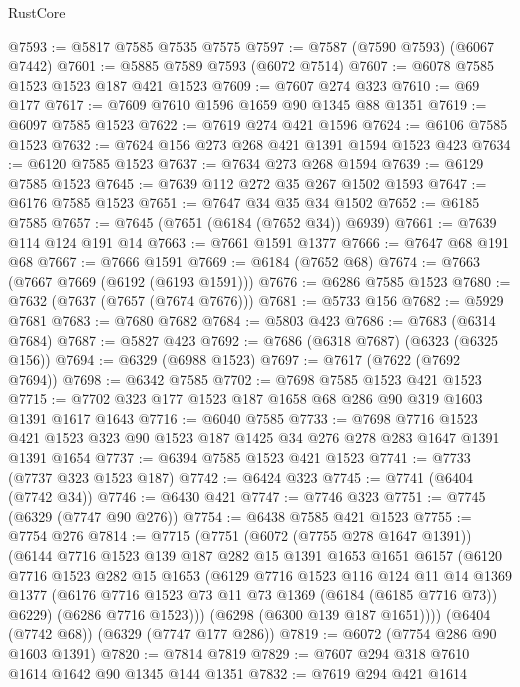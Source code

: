 \begin{lexlean}{RustCore}
\begin{coremodule}
@7593 := @5817 @7585 @7535 @7575
@7597 := @7587 (@7590 @7593) (@6067 @7442)
@7601 := @5885 @7589 @7593 (@6072 @7514)
@7607 := @6078 @7585 @1523 @1523 @187 @421 @1523
@7609 := @7607 @274 @323
@7610 := @69 @177
@7617 := @7609 @7610 @1596 @1659 @90 @1345 @88 @1351
@7619 := @6097 @7585 @1523
@7622 := @7619 @274 @421 @1596
@7624 := @6106 @7585 @1523
@7632 := @7624 @156 @273 @268 @421 @1391 @1594 @1523 @423
@7634 := @6120 @7585 @1523
@7637 := @7634 @273 @268 @1594
@7639 := @6129 @7585 @1523
@7645 := @7639 @112 @272 @35 @267 @1502 @1593
@7647 := @6176 @7585 @1523
@7651 := @7647 @34 @35 @34 @1502
@7652 := @6185 @7585
@7657 := @7645 (@7651 (@6184 (@7652 @34)) @6939)
@7661 := @7639 @114 @124 @191 @14
@7663 := @7661 @1591 @1377
@7666 := @7647 @68 @191 @68
@7667 := @7666 @1591
@7669 := @6184 (@7652 @68)
@7674 := @7663 (@7667 @7669 (@6192 (@6193 @1591)))
@7676 := @6286 @7585 @1523
@7680 := @7632 (@7637 (@7657 (@7674 @7676)))
@7681 := @5733 @156
@7682 := @5929 @7681
@7683 := @7680 @7682
@7684 := @5803 @423
@7686 := @7683 (@6314 @7684)
@7687 := @5827 @423
@7692 := @7686 (@6318 @7687) (@6323 (@6325 @156))
@7694 := @6329 (@6988 @1523)
@7697 := @7617 (@7622 (@7692 @7694))
@7698 := @6342 @7585
@7702 := @7698 @7585 @1523 @421 @1523
@7715 := @7702 @323 @177 @1523 @187 @1658 @68 @286 @90 @319 @1603 @1391 @1617 @1643
@7716 := @6040 @7585
@7733 := @7698
    @7716
    @1523
    @421
    @1523
    @323
    @90
    @1523
    @187
    @1425
    @34
    @276
    @278
    @283
    @1647
    @1391
    @1391
    @1654
@7737 := @6394 @7585 @1523 @421 @1523
@7741 := @7733 (@7737 @323 @1523 @187)
@7742 := @6424 @323
@7745 := @7741 (@6404 (@7742 @34))
@7746 := @6430 @421
@7747 := @7746 @323
@7751 := @7745 (@6329 (@7747 @90 @276))
@7754 := @6438 @7585 @421 @1523
@7755 := @7754 @276
@7814 := @7715
    (@7751
      (@6072 (@7755 @278 @1647 @1391))
      (@6144
        @7716
        @1523
        @139
        @187
        @282
        @15
        @1391
        @1653
        @1651
        @6157
        (@6120
          @7716
          @1523
          @282
          @15
          @1653
          (@6129
            @7716
            @1523
            @116
            @124
            @11
            @14
            @1369
            @1377
            (@6176 @7716 @1523 @73 @11 @73 @1369 (@6184 (@6185 @7716 @73)) @6229)
            (@6286 @7716 @1523)))
        (@6298 (@6300 @139 @187 @1651))))
    (@6404 (@7742 @68))
    (@6329 (@7747 @177 @286))
@7819 := @6072 (@7754 @286 @90 @1603 @1391)
@7820 := @7814 @7819
@7829 := @7607 @294 @318 @7610 @1614 @1642 @90 @1345 @144 @1351
@7832 := @7619 @294 @421 @1614

\end{coremodule}
\end{lexlean}
